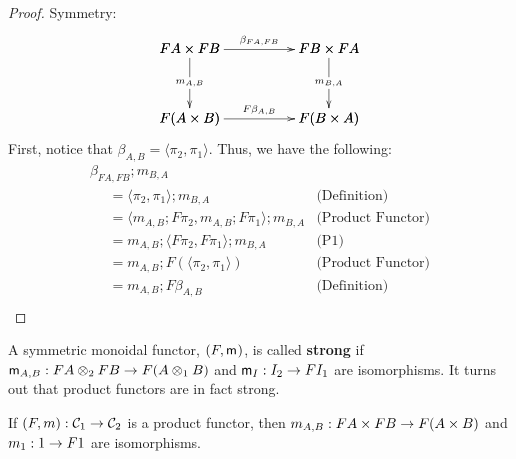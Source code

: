 \begin{proof}
\item[] Symmetry:\\
  \[
  \bfig
  \square|amma|/->`->`->`->/<1000,500>[
    FA \times FB`
    FB \times FA`
    F(A \times B)`
    F(B \times A);
    {\beta}_{FA,FB}`
    m_{A,B}`
    m_{B,A}`
    F{\beta}_{A,B}]
  \efig
  \]
  First, notice that $\beta_{A,B} = \langle \pi_2, \pi_1 \rangle$.  Thus, we have the following:
  \[
  \begin{array}{lll}
    \beta_{FA,FB};m_{B,A}\\
    \,\,\,\,\,\,\,\,=  \langle \pi_2, \pi_1 \rangle;m_{B,A} & \text{(Definition)}\\
    \,\,\,\,\,\,\,\,=  \langle m_{A,B};F\pi_2, m_{A,B};F\pi_1 \rangle;m_{B,A} & \text{(Product Functor)}\\
    \,\,\,\,\,\,\,\,=  m_{A,B};\langle F\pi_2, F\pi_1 \rangle;m_{B,A} & \text{(P1)}\\
    \,\,\,\,\,\,\,\,=  m_{A,B};F(\langle \pi_2, \pi_1 \rangle) & \text{(Product Functor)}\\
    \,\,\,\,\,\,\,\,=  m_{A,B};F\beta_{A,B} & \text{(Definition)}\\
  \end{array}
  \]
\end{proof}
\fi
\noindent
A symmetric monoidal functor, $(F, \mathsf{m}_{})$, is called \textbf{strong}
if $\m{A,B} : FA \otimes_2 FB \mto F(A \otimes_1 B)$ and $\m{I} : I_2
\mto FI_1$ are isomorphisms.  It turns out that product functors are
in fact strong.
\begin{lemma}
  \label{lemma:product_functors_iso}
  If $(F,m) : \cat{C}_1 \mto \cat{C}_2$ is a product functor, then
  $m_{A,B} : FA \times FB \mto F(A \times B)$ and $m_1 : 1 \mto F1$ are
  isomorphisms.
\end{lemma}
\iffalse
